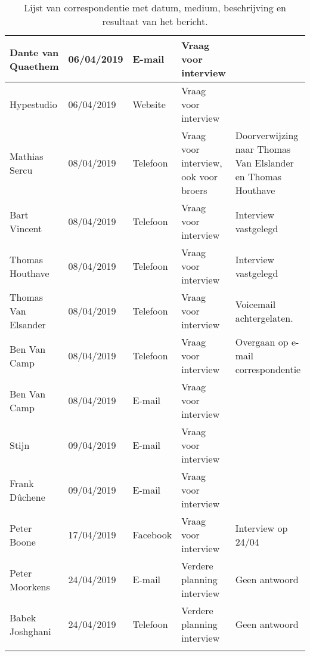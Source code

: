 \begin{landscape}
\begin{longtable}{|l|l|l|l|l|}
    \hline
    Dante van Quaethem & 06/04/2019 & E-mail & Vraag voor interview &  \\
    \hline
    Hypestudio & 06/04/2019 & Website & Vraag voor interview &  \\
    \hline
    Mathias Sercu & 08/04/2019 & Telefoon & Vraag voor interview, ook voor broers & Doorverwijzing naar Thomas Van
    Elslander en Thomas Houthave \\
    \hline
    Bart Vincent & 08/04/2019 & Telefoon & Vraag voor interview & Interview vastgelegd \\
    \hline
    Thomas Houthave & 08/04/2019 & Telefoon & Vraag voor interview & Interview vastgelegd \\
    \hline
    Thomas Van Elsander & 08/04/2019 & Telefoon & Vraag voor interview & Voicemail achtergelaten. \\
    \hline
    Ben Van Camp & 08/04/2019 & Telefoon & Vraag voor interview & Overgaan op e-mail correspondentie \\
    \hline
    Ben Van Camp & 08/04/2019 & E-mail & Vraag voor interview &  \\
    \hline
    Stijn & 09/04/2019 & E-mail & Vraag voor interview &  \\
    \hline
    Frank Dûchene & 09/04/2019 & E-mail & Vraag voor interview &  \\
    \hline
    Peter Boone & 17/04/2019 & Facebook & Vraag voor interview & Interview op 24/04 \\
    \hline
    Peter Moorkens & 24/04/2019 & E-mail & Verdere planning interview & Geen antwoord \\
    \hline
    Babek Joshghani & 24/04/2019 & Telefoon & Verdere planning interview & Geen antwoord \\
    \hline
  \caption{Lijst van correspondentie met datum, medium, beschrijving en resultaat van het bericht.}
  \label{table:correspondentie}
\end{longtable}
\end{landscape}